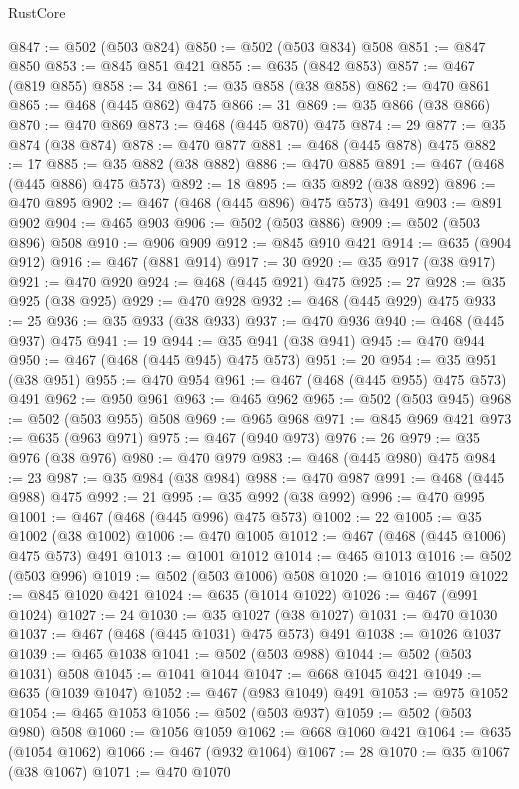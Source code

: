 \begin{lexlean}{RustCore}
\begin{coremodule}
@847 := @502 (@503 @824)
@850 := @502 (@503 @834) @508
@851 := @847 @850
@853 := @845 @851 @421
@855 := @635 (@842 @853)
@857 := @467 (@819 @855)
@858 := 34
@861 := @35 @858 (@38 @858)
@862 := @470 @861
@865 := @468 (@445 @862) @475
@866 := 31
@869 := @35 @866 (@38 @866)
@870 := @470 @869
@873 := @468 (@445 @870) @475
@874 := 29
@877 := @35 @874 (@38 @874)
@878 := @470 @877
@881 := @468 (@445 @878) @475
@882 := 17
@885 := @35 @882 (@38 @882)
@886 := @470 @885
@891 := @467 (@468 (@445 @886) @475 @573)
@892 := 18
@895 := @35 @892 (@38 @892)
@896 := @470 @895
@902 := @467 (@468 (@445 @896) @475 @573) @491
@903 := @891 @902
@904 := @465 @903
@906 := @502 (@503 @886)
@909 := @502 (@503 @896) @508
@910 := @906 @909
@912 := @845 @910 @421
@914 := @635 (@904 @912)
@916 := @467 (@881 @914)
@917 := 30
@920 := @35 @917 (@38 @917)
@921 := @470 @920
@924 := @468 (@445 @921) @475
@925 := 27
@928 := @35 @925 (@38 @925)
@929 := @470 @928
@932 := @468 (@445 @929) @475
@933 := 25
@936 := @35 @933 (@38 @933)
@937 := @470 @936
@940 := @468 (@445 @937) @475
@941 := 19
@944 := @35 @941 (@38 @941)
@945 := @470 @944
@950 := @467 (@468 (@445 @945) @475 @573)
@951 := 20
@954 := @35 @951 (@38 @951)
@955 := @470 @954
@961 := @467 (@468 (@445 @955) @475 @573) @491
@962 := @950 @961
@963 := @465 @962
@965 := @502 (@503 @945)
@968 := @502 (@503 @955) @508
@969 := @965 @968
@971 := @845 @969 @421
@973 := @635 (@963 @971)
@975 := @467 (@940 @973)
@976 := 26
@979 := @35 @976 (@38 @976)
@980 := @470 @979
@983 := @468 (@445 @980) @475
@984 := 23
@987 := @35 @984 (@38 @984)
@988 := @470 @987
@991 := @468 (@445 @988) @475
@992 := 21
@995 := @35 @992 (@38 @992)
@996 := @470 @995
@1001 := @467 (@468 (@445 @996) @475 @573)
@1002 := 22
@1005 := @35 @1002 (@38 @1002)
@1006 := @470 @1005
@1012 := @467 (@468 (@445 @1006) @475 @573) @491
@1013 := @1001 @1012
@1014 := @465 @1013
@1016 := @502 (@503 @996)
@1019 := @502 (@503 @1006) @508
@1020 := @1016 @1019
@1022 := @845 @1020 @421
@1024 := @635 (@1014 @1022)
@1026 := @467 (@991 @1024)
@1027 := 24
@1030 := @35 @1027 (@38 @1027)
@1031 := @470 @1030
@1037 := @467 (@468 (@445 @1031) @475 @573) @491
@1038 := @1026 @1037
@1039 := @465 @1038
@1041 := @502 (@503 @988)
@1044 := @502 (@503 @1031) @508
@1045 := @1041 @1044
@1047 := @668 @1045 @421
@1049 := @635 (@1039 @1047)
@1052 := @467 (@983 @1049) @491
@1053 := @975 @1052
@1054 := @465 @1053
@1056 := @502 (@503 @937)
@1059 := @502 (@503 @980) @508
@1060 := @1056 @1059
@1062 := @668 @1060 @421
@1064 := @635 (@1054 @1062)
@1066 := @467 (@932 @1064)
@1067 := 28
@1070 := @35 @1067 (@38 @1067)
@1071 := @470 @1070

\end{coremodule}
\end{lexlean}

